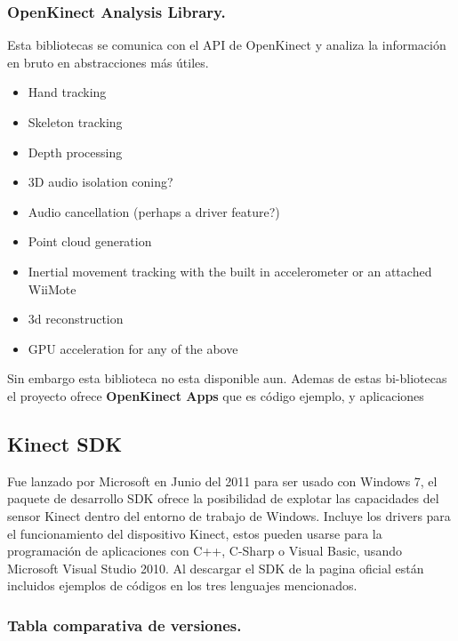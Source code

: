 \documentclass[11pt,a4paper]{article}
\begin{document}
\subsubsection{OpenKinect Analysis Library.}
Esta bibliotecas se comunica con el API de OpenKinect y analiza la información en bruto en abstracciones más útiles.
\begin{itemize}
\item Hand tracking
\item Skeleton tracking
\item Depth processing
\item 3D audio isolation coning?
\item Audio cancellation (perhaps a driver feature?)
\item Point cloud generation
\item Inertial movement tracking with the built in accelerometer or an attached WiiMote
\item 3d reconstruction
\item GPU acceleration for any of the above 
\end{itemize}
Sin embargo esta biblioteca no esta disponible aun. Ademas de estas bi-bliotecas el proyecto ofrece \textbf{OpenKinect Apps} que es  código ejemplo, y aplicaciones 
\subsection{Kinect SDK}
Fue lanzado por Microsoft en Junio del 2011 para ser usado con Windows 7, el paquete de desarrollo SDK ofrece la posibilidad de explotar las capacidades del sensor Kinect dentro del entorno de trabajo de Windows. Incluye los drivers para el funcionamiento del dispositivo Kinect, estos pueden usarse para la programación de aplicaciones con C++, C-Sharp o Visual Basic, usando Microsoft Visual Studio 2010. Al descargar el SDK de la pagina oficial están incluidos ejemplos de códigos en los tres lenguajes mencionados.

\subsubsection{Tabla comparativa de versiones.}
\end{document}
